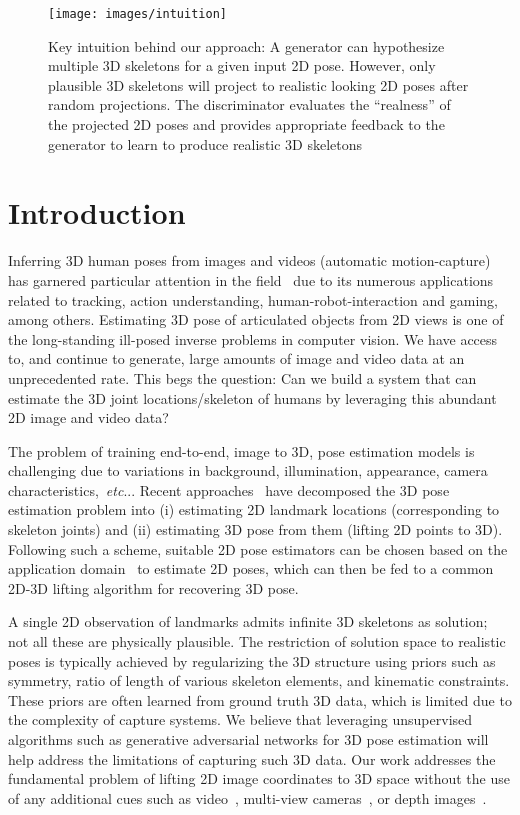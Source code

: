\documentclass[runningheads]{llncs}
\makeatletter
\DeclareRobustCommand\onedot{\futurelet\@let@token\@onedot}
\def\@onedot{\ifx\@let@token.\else.\null\fi\xspace}
\def\etc{\emph{etc}\onedot} \def\vs{\emph{vs}\onedot}
\makeatother
\begin{document}
\begin{figure}[t!]
	\centering
	\texttt{[image: images/intuition]}
	\caption{Key intuition behind our approach: A generator can hypothesize multiple 3D skeletons for a given input 2D pose. However, only plausible 3D skeletons will project to realistic looking 2D poses after random projections. The discriminator evaluates the ``realness'' of the projected 2D poses and provides appropriate feedback to the generator to learn to produce realistic 3D skeletons}
	\label{fig:intuition}
\end{figure}\section{Introduction}\label{sect:introduction}

Inferring 3D human poses from images and videos (automatic motion-capture) has garnered particular attention in the field~\cite{hogg1983model,o1980model,forsyth2006computational,moeslund2001survey} due to its numerous applications related to tracking, action understanding, human-robot-interaction and gaming, among others. Estimating 3D pose of articulated objects from 2D views is one of the long-standing ill-posed inverse problems in computer vision. We have access to, and continue to generate, large amounts of image and video data at an unprecedented rate.
This begs the question: Can we build a system that can estimate the 3D joint locations/skeleton of humans by leveraging this abundant 2D image and video data?

The problem of training end-to-end, image to 3D, pose estimation models is challenging due to variations in background, illumination, appearance, camera characteristics,~\etc. Recent approaches~\cite{MartinezICCV2017,Moreno-Noguer_2017_CVPR} have decomposed the 3D pose estimation problem into (i) estimating 2D landmark locations (corresponding to skeleton joints) and (ii) estimating 3D pose from them ({lifting 2D points to 3D}). Following such a scheme, suitable 2D pose estimators can be chosen based on the application domain~\cite{cpm,stacked-hourglass,PartAffinityCVPR2017,mask-rcnn} to estimate 2D poses, which can then be fed to a common 2D-3D lifting algorithm for recovering 3D pose.

A single 2D observation of landmarks admits infinite 3D skeletons as solution; not all these are physically plausible. The restriction of solution space to realistic poses is typically achieved by regularizing the 3D structure using priors such as symmetry, ratio of length of various skeleton elements, and kinematic constraints. These priors are often learned from ground truth 3D data, which is limited due to the complexity of capture systems. We believe that leveraging unsupervised algorithms such as generative adversarial networks for 3D pose estimation will help address the limitations of capturing such 3D data. Our work addresses the fundamental problem of lifting 2D image coordinates to 3D space without the use of any additional cues such as video~\cite{Zhou_2016_CVPR,tekin2016direct}, multi-view cameras~\cite{amin2013multi,hofmann2012multi}, or depth images~\cite{rafi2015semantic,yub2015random,shotton2013real}.
\end{document}
